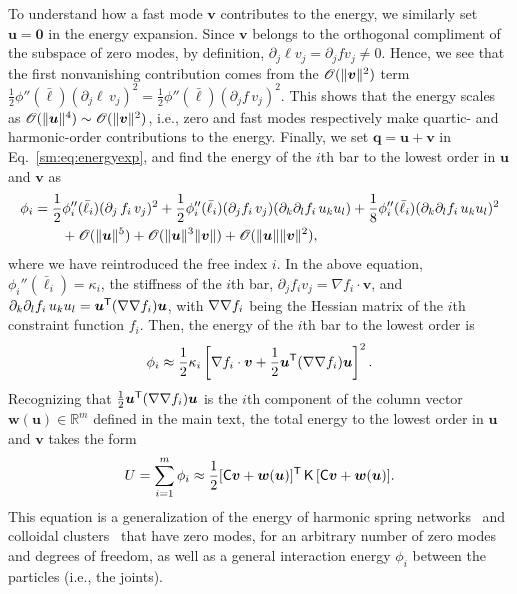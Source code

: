 To understand how a fast mode $\bm{v}$ contributes to the energy, we similarly set $\bm{u} = \bm{0}$ in the energy expansion.
Since $\bm{v}$ belongs to the orthogonal compliment of the subspace of zero modes, by definition, $\partial_j \ell v_j = \partial_j f v_j \ne 0$.
Hence, we see that the first nonvanishing contribution comes from the $\mathscr{O}(\lVert\bm{v}\rVert^2)$ term $\frac{1}{2}\phi''(\bar{\ell})(\partial_j \ell\, v_j)^2 = \frac{1}{2}\phi''(\bar{\ell})(\partial_j f\, v_j)^2$.
This shows that the energy scales as $\mathscr{O}(\lVert\bm{u}\rVert^4) \sim \mathscr{O}(\lVert\bm{v}\rVert^2)$, i.e., zero and fast modes respectively make quartic- and harmonic-order contributions to the energy.
Finally, we set $\bm{q} = \bm{u} + \bm{v}$ in Eq.~\eqref{sm:eq:energyexp}, and find the energy of the $i$th bar to the lowest order in $\bm{u}$ and $\bm{v}$ as
%
\begin{equation}
  \begin{aligned}
    \phi_i &= \frac{1}{2}\phi_i''(\bar{\ell}_i)(\partial_j\, f_i\, v_j)^2 + \frac{1}{2}\phi''_i(\bar{\ell}_i)(\partial_j f_i\, v_j)(\partial_k \partial_l f_i\, u_k u_l) + \frac{1}{8}\phi''_i(\bar{\ell}_i)(\partial_k \partial_l f_i\, u_k u_l)^2\\
           &\qquad+ \mathscr{O}(\lVert\bm{u}\rVert^5) + \mathscr{O}(\lVert\bm{u}\rVert^{3}\lVert\bm{v}\rVert) +\mathscr{O}(\lVert\bm{u}\rVert\lVert\bm{v}\rVert^{2}),
  \end{aligned}
\end{equation}
%
where we have reintroduced the free index $i$.
In the above equation, $\phi_{i}''(\bar{\ell}_i) = \kappa_i$, the stiffness of the $i$th bar, $\partial_j f_i v_j = \nabla f_i\cdot\bm{v}$, and $\partial_k\partial_l f_i\, u_k u_l = \bm{u}^\mathsf{T}(\nabla\nabla f_i)\bm{u}$, with $\nabla\nabla f_i$ being the Hessian matrix of the $i$th constraint function $f_i$.
Then, the energy of the $i$th bar to the lowest order is
%
\begin{equation}
  \phi_i \approx \frac{1}{2}\kappa_i \left[\nabla f_i\cdot\bm{v} + \frac{1}{2}\bm{u}^\mathsf{T}(\nabla\nabla f_i)\bm{u}\right]^2.
\end{equation}
%
Recognizing that $\frac{1}{2}\bm{u}^\mathsf{T}(\nabla\nabla f_{i})\bm{u}$ is the $i$th component of the column vector $\bm{w}(\bm{u}) \in \mathbb{R}^{m}$ defined in the main text, the total energy to the lowest order in $\bm{u}$ and $\bm{v}$ takes the form
%
\begin{equation}
  U = \sum_{i=1}^m \phi_i \approx \frac{1}{2} [\mathsf{C}\bm{v} + \bm{w}(\bm{u})]^\mathsf{T}\,\mathsf{K}\,[\mathsf{C}\bm{v} + \bm{w}(\bm{u})].
  \label{eq:energy_singular}
\end{equation}
%
This equation is a generalization of the energy of harmonic spring networks~\cite{zhang2016,woodhouse2018} and colloidal clusters~\cite{kallus2017} that have zero modes, for an arbitrary number of zero modes and degrees of freedom, as well as a general interaction energy $\phi_{i}$ between the particles (i.e., the joints).
